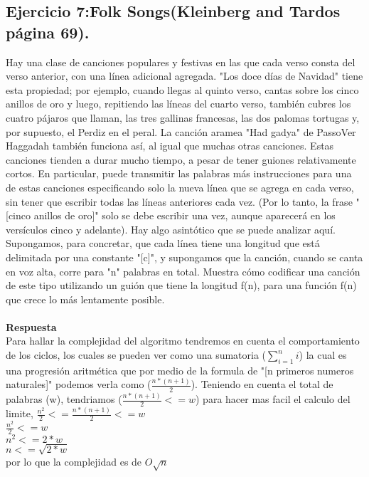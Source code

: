 \documentclass[a4paper,12pt]{article}
\begin{document}
\subsection{Ejercicio 7:Folk Songs(Kleinberg and Tardos página 69).}
Hay una clase de canciones populares y festivas en las que cada verso consta del verso anterior, con una línea adicional agregada. "Los doce días de Navidad" tiene esta propiedad; por ejemplo, cuando llegas al quinto verso, cantas sobre los cinco anillos de oro y luego, repitiendo las líneas del cuarto verso, también cubres los cuatro pájaros que llaman, las tres gallinas francesas, las dos palomas tortugas y, por supuesto, el Perdiz en el peral. La canción aramea "Had gadya" de PassoVer Haggadah también funciona así, al igual que muchas otras canciones.
Estas canciones tienden a durar mucho tiempo, a pesar de tener guiones relativamente cortos. En particular, puede transmitir las palabras más instrucciones para una de estas canciones especificando solo la nueva línea que se agrega en cada verso, sin tener que escribir todas las líneas anteriores cada vez. (Por lo tanto, la frase "[cinco anillos de oro]" solo se debe escribir una vez, aunque aparecerá en los versículos cinco y adelante).
Hay algo asintótico que se puede analizar aquí. Supongamos, para concretar, que cada línea tiene una longitud que está delimitada por una constante "[c]", y supongamos que la canción, cuando se canta en voz alta, corre para "n" palabras en total. Muestra cómo codificar una canción de este tipo utilizando un guión que tiene la longitud f(n), para una función f(n) que crece lo más lentamente posible.\\\\
\textbf{Respuesta}\\

Para hallar la complejidad del algoritmo tendremos en cuenta el comportamiento de los ciclos, los cuales se pueden ver como una sumatoria ($\sum_{i=1}^{n}i$) la cual es una progresión aritmética que por medio de la formula de "[n primeros numeros naturales]" podemos verla como ($\frac{n*(n+1)}{2}$).
Teniendo en cuenta el total de palabras (w), tendriamos ($\frac{n*(n+1)}{2} <= w$) para hacer mas facil el calculo del limite, $\frac{n^2}{2}<= \frac{n*(n+1)}{2} <= w$\\
 $\frac{n^2}{2}<= w$\\
 $n^2<= 2*w$\\
 $n<= \sqrt{2*w}$\\
 por lo que la complejidad es de $O\sqrt{n}$
\end{document}
